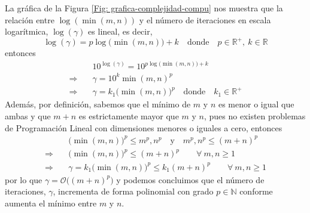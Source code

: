 \documentclass[titlepage]{article}
\newcommand{\Real}{\mathbb{R}}
\newcommand{\Natural}{\mathbb{N}}
\begin{document}
La gráfica de la Figura \ref{Fig: grafica-complejidad-compu} nos muestra que la relación entre $\log(\min(m,n))$ y el número de iteraciones en escala logarítmica, $\log(\gamma)$ es lineal, es decir,
\begin{equation*}
    \log(\gamma) = p\log\big(\min(m,n)\big) + k \quad \text{donde} \quad p \in \Real^+,\ k \in \Real
\end{equation*}
entonces \hfill \null
\begin{align*}
    & 10^{\log(\gamma)} = 10^{p\log\big(\min(m,n)\big) + k} \\
    \Longrightarrow \quad & \gamma = 10^k\min(m,n)^p \\
    \Longrightarrow \quad & \gamma = k_1\big(\min(m,n)\big)^p \quad \text{donde} \quad k_1 \in \Real^+  
\end{align*}
Además, por definición, sabemos que el mínimo de $m$ y $n$ es menor o igual que ambas y que $m + n$ es estrictamente mayor que $m$ y $n$, pues no existen problemas de Programación Lineal con dimensiones menores o iguales a cero, entonces 
\begin{align*}
    & \big(\min(m,n)\big)^p \leq m^p, n^p \quad \text{y} \quad m^p, n^p \leq (m + n)^p \\[2pt]
    \Longrightarrow \quad & \big(\min(m,n)\big)^p \leq (m + n)^p \qquad \forall \ m,n \geq 1 \\[2pt]
    \Longrightarrow \quad & \gamma = k_1\big(\min(m,n)\big)^p \leq k_1(m + n)^p \qquad \forall \ m,n \geq 1
\end{align*}
por lo que $\gamma = \mathcal{O}\big((m+n)^p\big)$ y podemos concluimos que el número de iteraciones, $\gamma$, incrementa de forma polinomial con grado $p \in \Natural$ conforme aumenta el mínimo entre $m$ y $n$.

\newpage
\end{document}
